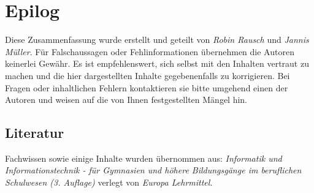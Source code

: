 \documentclass[12pt,a4paper]{article}
\begin{document}
\section{Epilog}
    \noindent
    Diese Zusammenfassung wurde erstellt und geteilt von \textit{Robin Rausch} und \textit{Jannis Müller}. Für Falschaussagen oder Fehlinformationen übernehmen die Autoren keinerlei Gewähr. Es ist empfehlenswert, sich selbst mit den Inhalten vertraut zu machen und die hier dargestellten Inhalte gegebenenfalls zu korrigieren. Bei Fragen oder inhaltlichen Fehlern kontaktieren sie bitte umgehend einen der Autoren und weisen auf die von Ihnen festgestellten Mängel hin. 
    
\subsection{Literatur}
Fachwissen sowie einige Inhalte wurden übernommen aus:\newline
\textit{Informatik und Informationstechnik - für Gymnasien und höhere Bildungsgänge im beruflichen Schulwesen (3. Auflage)} verlegt von \textit{Europa Lehrmittel}. 
\end{document}
